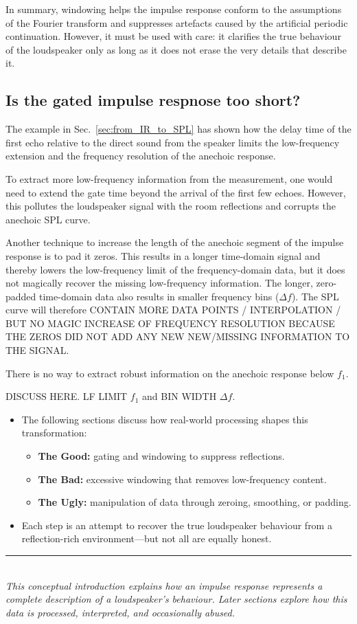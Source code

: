 \documentclass[12pt,a4paper]{article}
\providecommand{\secn}[1]{Sec.~\ref{sec:#1}}
\begin{document}
In summary, windowing helps the impulse response conform to the assumptions of the Fourier transform and suppresses artefacts caused by the artificial periodic continuation. However, it must be used with care: it clarifies the true behaviour of the loudspeaker only as long as it does not erase the very details that describe it.











\subsection{Is the gated impulse respnose too short?}
The example in \secn{from_IR_to_SPL} has shown how the delay time of the first echo relative to the direct sound from the speaker limits the low-frequency extension and the frequency resolution of the anechoic response. 

To extract more low-frequency information from the measurement, one would need to extend the gate time beyond the arrival of the first few echoes. However, this pollutes the loudspeaker signal with the room reflections and corrupts the anechoic SPL curve. 

Another technique to increase the length of the anechoic segment of the impulse response is to pad it zeros. This results in a longer time-domain signal and thereby lowers the low-frequency limit of the frequency-domain data, but it does not magically recover the missing low-frequency information. The longer, zero-padded time-domain data also results in smaller frequency bins ($\Delta f$). The SPL curve will therefore CONTAIN MORE DATA POINTS / INTERPOLATION / BUT NO MAGIC INCREASE OF FREQUENCY RESOLUTION BECAUSE THE ZEROS DID NOT ADD ANY NEW NEW/MISSING INFORMATION TO THE SIGNAL.

There is no way to extract robust information on the anechoic response below $f_1$.


DISCUSS HERE. LF LIMIT $f_1$ and BIN WIDTH $\Delta f$.





\begin{itemize}[noitemsep]
    \item The following sections discuss how real-world processing shapes this transformation:
    \begin{itemize}
        \item \textbf{The Good:} gating and windowing to suppress reflections.
        \item \textbf{The Bad:} excessive windowing that removes low-frequency content.
        \item \textbf{The Ugly:} manipulation of data through zeroing, smoothing, or padding.
    \end{itemize}
    \item Each step is an attempt to recover the true loudspeaker behaviour from a reflection-rich environment—but not all are equally honest.
\end{itemize}

\vspace{1em}
\noindent\rule{\textwidth}{0.4pt}\\
\textit{This conceptual introduction explains how an impulse response represents a complete description of a loudspeaker’s behaviour. Later sections explore how this data is processed, interpreted, and occasionally abused.}
\end{document}
